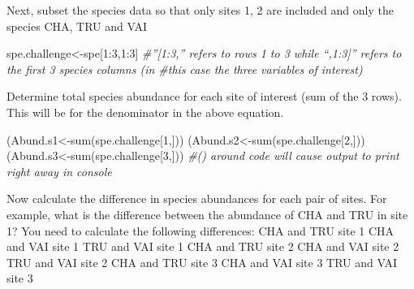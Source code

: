 \documentclass[
]{book}
\newenvironment{Shaded}{\begin{snugshade}}{\end{snugshade}}
\newcommand{\CommentTok}[1]{\textcolor[rgb]{0.56,0.35,0.01}{\textit{#1}}}
\newcommand{\DecValTok}[1]{\textcolor[rgb]{0.00,0.00,0.81}{#1}}
\newcommand{\FunctionTok}[1]{\textcolor[rgb]{0.00,0.00,0.00}{#1}}
\newcommand{\NormalTok}[1]{#1}
\newcommand{\OtherTok}[1]{\textcolor[rgb]{0.56,0.35,0.01}{#1}}
\newcommand{\SpecialCharTok}[1]{\textcolor[rgb]{0.00,0.00,0.00}{#1}}
\begin{document}
Next, subset the species data so that only sites 1, 2 are included and
only the species CHA, TRU and VAI

\begin{Shaded}
\begin{Highlighting}[]
\NormalTok{spe.challenge}\OtherTok{\textless{}{-}}\NormalTok{spe[}\DecValTok{1}\SpecialCharTok{:}\DecValTok{3}\NormalTok{,}\DecValTok{1}\SpecialCharTok{:}\DecValTok{3}\NormalTok{] }\CommentTok{\#”[1:3,” refers to rows 1 to 3 while “,1:3]” refers to the first 3 species columns (in \#this case the three variables of interest)}
\end{Highlighting}
\end{Shaded}

Determine total species abundance for each site of interest (sum of the
3 rows). This will be for the denominator in the above equation.

\begin{Shaded}
\begin{Highlighting}[]
\NormalTok{(Abund.s1}\OtherTok{\textless{}{-}}\FunctionTok{sum}\NormalTok{(spe.challenge[}\DecValTok{1}\NormalTok{,]))}
\NormalTok{(Abund.s2}\OtherTok{\textless{}{-}}\FunctionTok{sum}\NormalTok{(spe.challenge[}\DecValTok{2}\NormalTok{,]))}
\NormalTok{(Abund.s3}\OtherTok{\textless{}{-}}\FunctionTok{sum}\NormalTok{(spe.challenge[}\DecValTok{3}\NormalTok{,]))}
\CommentTok{\#() around code will cause output to print right away in console}
\end{Highlighting}
\end{Shaded}

Now calculate the difference in species abundances for each pair of
sites. For example, what is the difference between the abundance of CHA
and TRU in site 1? You need to calculate the following differences: CHA
and TRU site 1 CHA and VAI site 1 TRU and VAI site 1 CHA and TRU site 2
CHA and VAI site 2 TRU and VAI site 2 CHA and TRU site 3 CHA and VAI
site 3 TRU and VAI site 3
\end{document}
